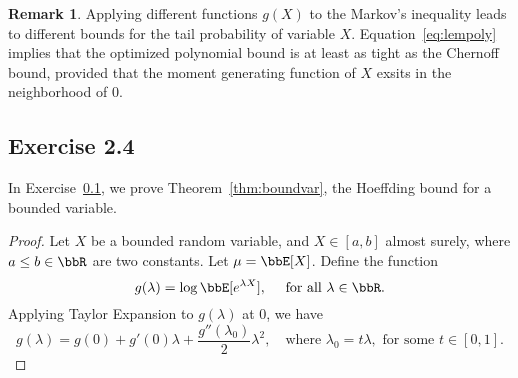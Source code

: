 \documentclass[11pt]{article}
\theoremstyle{plain}
\theoremstyle{definition}
\newtheorem{rmk}{Remark}
\begin{document}
\begin{rmk}
	Applying different functions $g(X)$ to the Markov's inequality leads to different bounds for the tail probability of variable $X$. Equation~\eqref{eq:lempoly} implies that the optimized polynomial bound is at least as tight as the Chernoff bound, provided that the moment generating function of $X$ exsits in the neighborhood of 0.  
\end{rmk}

\subsection{Exercise 2.4}\label{pro:boundvar}
In Exercise~\ref{pro:boundvar}, we prove Theorem~\ref{thm:boundvar},  the Hoeffding bound for a bounded variable. 

\begin{proof}
	
Let $X$ be a bounded random variable, and $X \in [a,b]$ almost surely, where $a 
\leq b \in \bbR$ are two constants. Let $\mu = \bbE[X]$. Define the function 
\[ g(\lambda) = \log \bbE[e^{\lambda X }], \quad  \text{ for all } \lambda \in \bbR. \]
Applying Taylor Expansion to $g(\lambda)$ at 0, we have
\begin{equation}\label{eq:taylor}
	g(\lambda) =  g(0) + g'(0) \lambda  + \frac{g''(\lambda_0) }{2} \lambda^2, \quad \text{where } \lambda_0 = t \lambda, \text{ for some } t \in [0,1]. 
\end{equation}


\end{proof}
\end{document}
